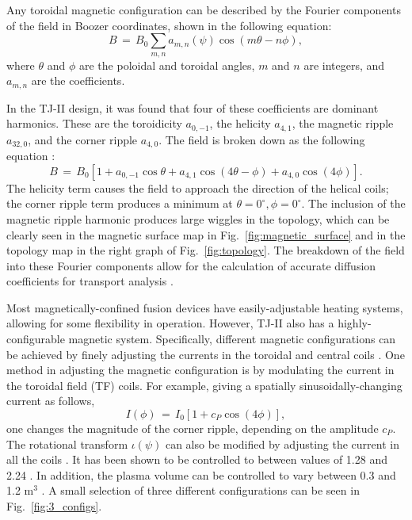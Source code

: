 \documentclass[a4paper]{article}
\begin{document}
Any toroidal magnetic configuration can be described by the Fourier components of the field in Boozer coordinates, shown in the following equation:
\begin{equation*}
	B \,=\, B_0 \sum_{m,n} a_{m,n}\left(\psi\right) \cos\left(m\theta - n\phi\right),
\end{equation*}
where $\theta$ and $\phi$ are the poloidal and toroidal angles, $m$ and $n$ are integers, and $a_{m,n}$ are the coefficients.

In the TJ-II design, it was found that four of these coefficients are dominant harmonics.
These are the toroidicity $a_{0,-1}$, the helicity $a_{4,1}$, the magnetic ripple $a_{32,0}$, and the corner ripple $a_{4,0}$.
The field is broken down as the following equation \cite{solano_study_1988}:
\begin{equation}
	B \,=\,B_0\left[1 + a_{0,-1}\cos\theta + a_{4,1}\cos\left(4\theta - \phi\right) + a_{4,0}\cos\left(4\phi\right)\right].
\end{equation}
The helicity term causes the field to approach the direction of the helical coils; the corner ripple term produces a minimum at $\theta = 0^{\circ}, \phi = 0^{\circ}$.
The inclusion of the magnetic ripple harmonic produces large wiggles in the topology, which can be clearly seen in the magnetic surface map in Fig.~\ref{fig:magnetic_surface} and in the topology map in the right graph of Fig.~\ref{fig:topology}.
The breakdown of the field into these Fourier components allow for the calculation of accurate diffusion coefficients for transport analysis \cite{solano_study_1988}.

Most magnetically-confined fusion devices have easily-adjustable heating systems, allowing for some flexibility in operation.
However, TJ-II also has a highly-configurable magnetic system.
Specifically, different magnetic configurations can be achieved by finely adjusting the currents in the toroidal and central coils \cite{solano_study_1988}.
One method in adjusting the magnetic configuration is by modulating the current in the toroidal field (TF) coils.
For example, giving a spatially sinusoidally-changing current as follows,
\begin{equation}
	I(\phi) \,=\, I_0 \left[1 + c_P\cos(4 \phi)\right],
\end{equation}
one changes the magnitude of the corner ripple, depending on the amplitude $c_P$.
The rotational transform $\iota(\psi)$ can also be modified by adjusting the current in all the coils \cite{solano_study_1988}.
It has been shown to be controlled to between values of 1.28 and 2.24 \cite{alejaldre_review_2001}.
In addition, the plasma volume can be controlled to vary between 0.3 and 1.2 m$^3$ \cite{alejaldre_first_1999}.
A small selection of three different configurations can be seen in Fig.~\ref{fig:3_configs}.
\end{document}
